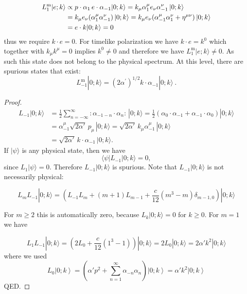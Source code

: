 \begin{align}
	L_{1}^{\mathrm{m}}|e ; k\rangle &\propto p \cdot \alpha_{1} \, e \cdot \alpha_{-1}|0 ; k\rangle= k_{\mu}\alpha^{\mu}_{1}e_{\nu}\alpha^{\nu}_{-1}\ket{0 ; k}\nonumber\\
	&= k_{\mu}e_{\nu}(\alpha^{\mu}_{1}\alpha^{\nu}_{-1})\ket{0 ; k}=k_{\mu}e_{\nu}(\alpha^{\mu}_{-1}\alpha^{\nu}_{1}+\eta^{\mu \nu})\ket{0 ; k}\nonumber\\
	&=e \cdot k|0 ; k\rangle=0 \label{4.1.17}
\end{align}
thus we require $k \cdot e=0$. For timelike polarization we have $k \cdot e=k^0$ which together with $k_{\mu}k^{\mu}=0$ implies $k^0\ne0$ and therefore we have $L_{1}^{\mathrm{m}}|e ; k\rangle\ne0$. As such this state does not belong to the physical spectrum. At this level, there are spurious states that exist:
\begin{equation}
	L_{-1}^{\mathrm{m}}|0 ; k\rangle=(2 \alpha^{\prime})^{1 / 2} k \cdot \alpha_{-1}|0 ; k\rangle \:. \label{4.1.18}
\end{equation}
\begin{tcolorbox}[breakable]
	\begin{proof}
		\begin{align}
			L_{-1} |0; k\rangle
			&= \frac{1}{2} \sum_{n=-\infty}^{\infty} : \alpha_{-1-n} \cdot \alpha_n : \, |0; k\rangle = \frac{1}{2} \left( \alpha_0 \cdot \alpha_{-1} + \alpha_{-1} \cdot \alpha_0 \right) |0; k\rangle \\
			&= \alpha_{-1}^\mu \sqrt{2\alpha'}\, p_\mu \, |0; k\rangle = \sqrt{2\alpha'}\, k_\mu \alpha_{-1}^\mu \, |0; k\rangle \\
			&= \sqrt{2\alpha'}\, k \cdot \alpha_{-1} \, |0; k\rangle .
		\end{align}
		If $|\psi\rangle$ is any physical state, then we have
		\begin{equation}
			\langle \psi | L_{-1} |0; k\rangle = 0,
		\end{equation}
		since $L_1 |\psi\rangle = 0$. Therefore $L_{-1} |0; k\rangle$ is spurious. Note that \( L_{-1} |0; k\rangle \) is not necessarily physical:
		
		\begin{equation}
			L_m L_{-1} |0; k\rangle = \left( L_{-1} L_m + (m+1) L_{m-1} + \frac{c}{12} (m^3 - m) \delta_{m-1,0} \right) |0; k\rangle 
		\end{equation}
		
		For \( m \geq 2 \) this is automatically zero, because \( L_k |0; k\rangle = 0 \) for \( k \geq 0 \). For \( m = 1 \) we have
		
		\begin{equation}
			L_1 L_{-1} |0; k\rangle = \left( 2L_0 + \frac{c}{12} (1^3 - 1) \right) |0; k\rangle = 2L_0 |0; k\rangle = 2\alpha' k^2 |0; k\rangle 
		\end{equation}
		where we used
		\begin{equation}
			L_0 \left| 0; k \right\rangle = \left( \alpha' p^2 + \sum_{n=1}^\infty \alpha_{-n} \alpha_n \right) \left| 0; k \right\rangle = \alpha' k^2 \left| 0; k \right\rangle
		\end{equation}
		QED.
	\end{proof}
\end{tcolorbox}

